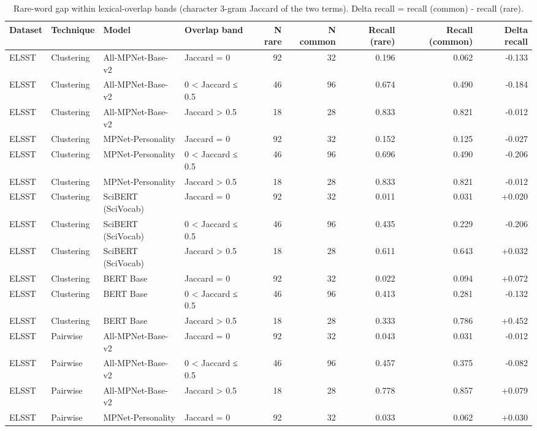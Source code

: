 \begin{table}[ht]
\centering
\small
\caption{Rare-word gap within lexical-overlap bands (character 3-gram Jaccard of the two terms). Delta recall = recall (common) - recall (rare).}
\label{tab:S4_rare_word_by_overlap}
\begin{tabular}{llllrrrrr}
\toprule
Dataset & Technique & Model & Overlap band & N rare & N common & Recall (rare) & Recall (common) & Delta recall \\
\midrule
ELSST & Clustering & All-MPNet-Base-v2 & Jaccard = 0 & 92 & 32 & 0.196 & 0.062 & -0.133 \\
ELSST & Clustering & All-MPNet-Base-v2 & 0 < Jaccard ≤ 0.5 & 46 & 96 & 0.674 & 0.490 & -0.184 \\
ELSST & Clustering & All-MPNet-Base-v2 & Jaccard > 0.5 & 18 & 28 & 0.833 & 0.821 & -0.012 \\
ELSST & Clustering & MPNet-Personality & Jaccard = 0 & 92 & 32 & 0.152 & 0.125 & -0.027 \\
ELSST & Clustering & MPNet-Personality & 0 < Jaccard ≤ 0.5 & 46 & 96 & 0.696 & 0.490 & -0.206 \\
ELSST & Clustering & MPNet-Personality & Jaccard > 0.5 & 18 & 28 & 0.833 & 0.821 & -0.012 \\
ELSST & Clustering & SciBERT (SciVocab) & Jaccard = 0 & 92 & 32 & 0.011 & 0.031 & +0.020 \\
ELSST & Clustering & SciBERT (SciVocab) & 0 < Jaccard ≤ 0.5 & 46 & 96 & 0.435 & 0.229 & -0.206 \\
ELSST & Clustering & SciBERT (SciVocab) & Jaccard > 0.5 & 18 & 28 & 0.611 & 0.643 & +0.032 \\
ELSST & Clustering & BERT Base & Jaccard = 0 & 92 & 32 & 0.022 & 0.094 & +0.072 \\
ELSST & Clustering & BERT Base & 0 < Jaccard ≤ 0.5 & 46 & 96 & 0.413 & 0.281 & -0.132 \\
ELSST & Clustering & BERT Base & Jaccard > 0.5 & 18 & 28 & 0.333 & 0.786 & +0.452 \\
ELSST & Pairwise & All-MPNet-Base-v2 & Jaccard = 0 & 92 & 32 & 0.043 & 0.031 & -0.012 \\
ELSST & Pairwise & All-MPNet-Base-v2 & 0 < Jaccard ≤ 0.5 & 46 & 96 & 0.457 & 0.375 & -0.082 \\
ELSST & Pairwise & All-MPNet-Base-v2 & Jaccard > 0.5 & 18 & 28 & 0.778 & 0.857 & +0.079 \\
ELSST & Pairwise & MPNet-Personality & Jaccard = 0 & 92 & 32 & 0.033 & 0.062 & +0.030 \\

\end{tabular}
\end{table}
